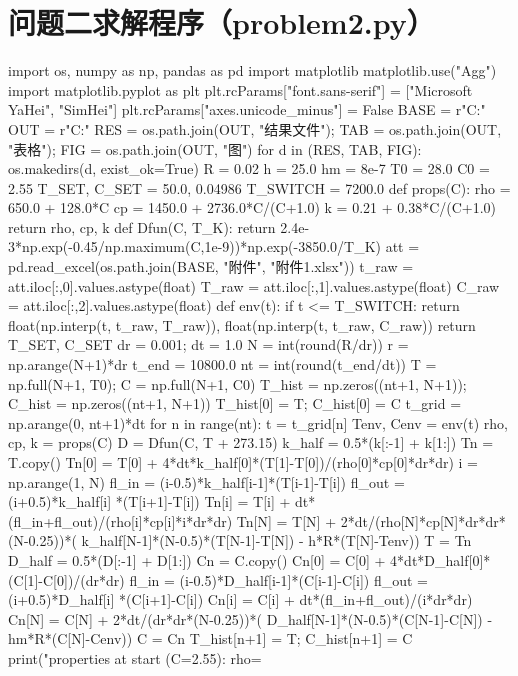 \section{问题二求解程序（problem2.py）}
\begin{codelisting}
import os, numpy as np, pandas as pd
import matplotlib
matplotlib.use("Agg")
import matplotlib.pyplot as plt
plt.rcParams["font.sans-serif"] = ["Microsoft YaHei", "SimHei"]
plt.rcParams["axes.unicode_minus"] = False
BASE = r"C:\Users{}\Desktop{}"
OUT  = r"C:\Users{}\Desktop\A"
RES  = os.path.join(OUT, "结果文件"); TAB = os.path.join(OUT, "表格"); FIG = os.path.join(OUT, "图")
for d in (RES, TAB, FIG): os.makedirs(d, exist_ok=True)
R    = 0.02
h    = 25.0
hm   = 8e-7
T0   = 28.0
C0   = 2.55
T_SET, C_SET = 50.0, 0.04986
T_SWITCH = 7200.0
def props(C):
    rho = 650.0 + 128.0*C
    cp  = 1450.0 + 2736.0*C/(C+1.0)
    k   = 0.21 + 0.38*C/(C+1.0)
    return rho, cp, k
def Dfun(C, T_K):
    return 2.4e-3*np.exp(-0.45/np.maximum(C,1e-9))*np.exp(-3850.0/T_K)
att = pd.read_excel(os.path.join(BASE, "附件", "附件1.xlsx"))
t_raw = att.iloc[:,0].values.astype(float)
T_raw = att.iloc[:,1].values.astype(float)
C_raw = att.iloc[:,2].values.astype(float)
def env(t):
    if t <= T_SWITCH:
        return float(np.interp(t, t_raw, T_raw)), float(np.interp(t, t_raw, C_raw))
    return T_SET, C_SET
dr = 0.001; dt = 1.0
N  = int(round(R/dr))
r  = np.arange(N+1)*dr
t_end = 10800.0
nt = int(round(t_end/dt))
T = np.full(N+1, T0); C = np.full(N+1, C0)
T_hist = np.zeros((nt+1, N+1)); C_hist = np.zeros((nt+1, N+1))
T_hist[0] = T; C_hist[0] = C
t_grid = np.arange(0, nt+1)*dt
for n in range(nt):
    t = t_grid[n]
    Tenv, Cenv = env(t)
    rho, cp, k = props(C)
    D = Dfun(C, T + 273.15)
    k_half = 0.5*(k[:-1] + k[1:])
    Tn = T.copy()
    Tn[0] = T[0] + 4*dt*k_half[0]*(T[1]-T[0])/(rho[0]*cp[0]*dr*dr)
    i = np.arange(1, N)
    fl_in  = (i-0.5)*k_half[i-1]*(T[i-1]-T[i])
    fl_out = (i+0.5)*k_half[i]  *(T[i+1]-T[i])
    Tn[i] = T[i] + dt*(fl_in+fl_out)/(rho[i]*cp[i]*i*dr*dr)
    Tn[N] = T[N] + 2*dt/(rho[N]*cp[N]*dr*dr*(N-0.25))*(
            k_half[N-1]*(N-0.5)*(T[N-1]-T[N]) - h*R*(T[N]-Tenv))
    T = Tn
    D_half = 0.5*(D[:-1] + D[1:])
    Cn = C.copy()
    Cn[0] = C[0] + 4*dt*D_half[0]*(C[1]-C[0])/(dr*dr)
    fl_in  = (i-0.5)*D_half[i-1]*(C[i-1]-C[i])
    fl_out = (i+0.5)*D_half[i]  *(C[i+1]-C[i])
    Cn[i] = C[i] + dt*(fl_in+fl_out)/(i*dr*dr)
    Cn[N] = C[N] + 2*dt/(dr*dr*(N-0.25))*(
            D_half[N-1]*(N-0.5)*(C[N-1]-C[N]) - hm*R*(C[N]-Cenv))
    C = Cn
    T_hist[n+1] = T; C_hist[n+1] = C
print("properties at start (C=2.55): rho=%

\end{codelisting}
